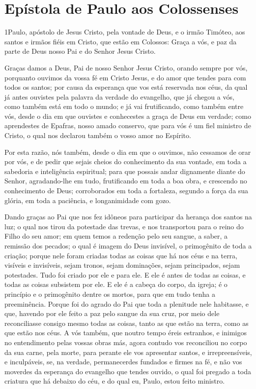 \thispagestyle{empty}
\chapter*{Epístola de Paulo aos Colossenses}

\lettrine{1} Paulo, apóstolo de Jesus Cristo, pela vontade de
Deus, e o irmão Timóteo, aos santos e irmãos fiéis em Cristo,
que estão em Colossos: Graça a vós, e paz da parte de Deus nosso Pai
e do Senhor Jesus Cristo.

Graças damos a Deus, Pai de nosso Senhor Jesus Cristo, orando
sempre por vós, porquanto ouvimos da vossa fé em Cristo Jesus, e
do amor que tendes para com todos os santos; por causa da
esperança que vos está reservada nos céus, da qual já antes ouvistes
pela palavra da verdade do evangelho, que já chegou a vós, como
também está em todo o mundo; e já vai frutificando, como também
entre vós, desde o dia em que ouvistes e conhecestes a graça de Deus
em verdade; como aprendestes de Epafras, nosso amado conservo,
que para vós é um fiel ministro de Cristo, o qual nos declarou
também o vosso amor no Espírito.

Por esta razão, nós também, desde o dia em que o ouvimos, não
cessamos de orar por vós, e de pedir que sejais cheios do
conhecimento da sua vontade, em toda a sabedoria e inteligência
espiritual; para que possais andar dignamente diante do
Senhor, agradando-lhe em tudo, frutificando em toda a boa obra, e
crescendo no conhecimento de Deus; corroborados em toda a
fortaleza, segundo a força da sua glória, em toda a paciência, e
longanimidade com gozo.

Dando graças ao Pai que nos fez idôneos para participar da
herança dos santos na luz; o qual nos tirou da potestade das
trevas, e nos transportou para o reino do Filho do seu amor;
em quem temos a redenção pelo seu sangue, a saber, a remissão
dos pecados; o qual é imagem do Deus invisível, o primogênito
de toda a criação; porque nele foram criadas todas as coisas
que há nos céus e na terra, visíveis e invisíveis, sejam tronos,
sejam dominações, sejam principados, sejam potestades. Tudo foi
criado por ele e para ele. E ele é antes de todas as coisas,
e todas as coisas subsistem por ele. E ele é a cabeça do
corpo, da igreja; é o princípio e o primogênito dentre os mortos,
para que em tudo tenha a preeminência. Porque foi do agrado
do Pai que toda a plenitude nele habitasse, e que, havendo
por ele feito a paz pelo sangue da sua cruz, por meio dele
reconciliasse consigo mesmo todas as coisas, tanto as que estão na
terra, como as que estão nos céus. A vós também, que noutro
tempo éreis estranhos, e inimigos no entendimento pelas vossas obras
más, agora contudo vos reconciliou no corpo da sua carne,
pela morte, para perante ele vos apresentar santos, e
irrepreensíveis, e inculpáveis, se, na verdade, permanecerdes
fundados e firmes na fé, e não vos moverdes da esperança do
evangelho que tendes ouvido, o qual foi pregado a toda criatura que
há debaixo do céu, e do qual eu, Paulo, estou feito ministro.

